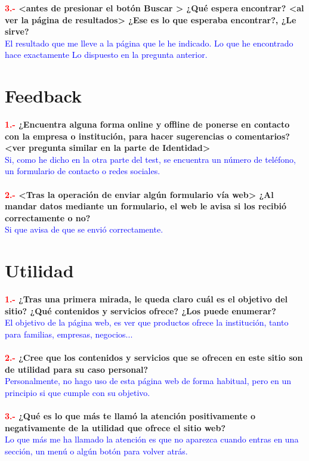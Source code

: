 \documentclass[openany,overnay,a4paper, twoside, 14pt]{book}
\begin{document}
\textbf{\textcolor{red}{3.-} <antes de presionar el botón Buscar > ¿Qué espera encontrar?
<al ver la página de resultados> ¿Ese es lo que esperaba encontrar?, ¿Le sirve?}\\
\textcolor{blue}{El resultado que me lleve a la página que le he indicado. Lo que he encontrado hace exactamente Lo dispuesto en la pregunta anterior.}

\chapter*{Feedback}
\textbf{\textcolor{red}{1.-} ¿Encuentra alguna forma online y offline de ponerse en contacto con la empresa o institución, para hacer sugerencias o comentarios? <ver pregunta similar en la parte de Identidad>}\\
\textcolor{blue}{Si, como he dicho en la otra parte del test, se encuentra un número de teléfono, un formulario de contacto o redes sociales.}\\
\\
\textbf{\textcolor{red}{2.-} <Tras la operación de enviar algún formulario vía web> ¿Al mandar datos mediante un formulario, el web le avisa si los recibió correctamente o no?}\\
\textcolor{blue}{Si que avisa de que se envió correctamente.}

\chapter*{Utilidad}
\textbf{\textcolor{red}{1.-} ¿Tras una primera mirada, le queda claro cuál es el objetivo del sitio? ¿Qué contenidos y servicios ofrece? ¿Los puede enumerar? }\\
\textcolor{blue}{El objetivo de la página web, es ver que productos ofrece la institución, tanto para familias, empresas, negocios...}\\
\\
\textbf{\textcolor{red}{2.-} ¿Cree que los contenidos y servicios que se ofrecen en este sitio son de utilidad para su caso personal?}\\
\textcolor{blue}{Personalmente, no hago uso de esta página web de forma habitual, pero en un principio si que cumple con su objetivo.}\\
\\
\textbf{\textcolor{red}{3.-} ¿Qué es lo que más te llamó la atención positivamente o negativamente de la utilidad que ofrece el sitio web?}\\
\textcolor{blue}{Lo que más me ha llamado la atención es que no aparezca cuando entras en una sección, un menú o algún botón para volver atrás.}
\end{document}

